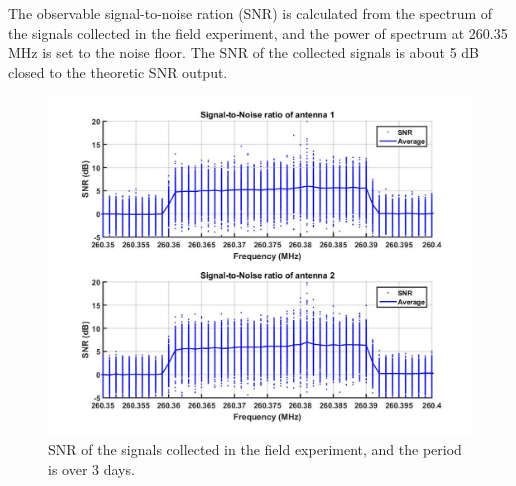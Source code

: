 \documentclass[draftcls,onecolumn]{IEEEtran}  %
\begin{document}
The observable signal-to-noise ration (SNR) is calculated from the spectrum of the signals collected in the field experiment, and the power of spectrum at 260.35 MHz is set to the noise floor. The SNR of the collected signals is about 5 dB closed to the theoretic SNR output.
\begin{figure}[h]
	\centering
	\includegraphics[width=\textwidth]{pdf/SNR.jpg}
	\caption{SNR of the signals collected in the field experiment, and the period is over 3 days.}
	\centering
	\label{fig:link_budget}
\end{figure}
\end{document}
